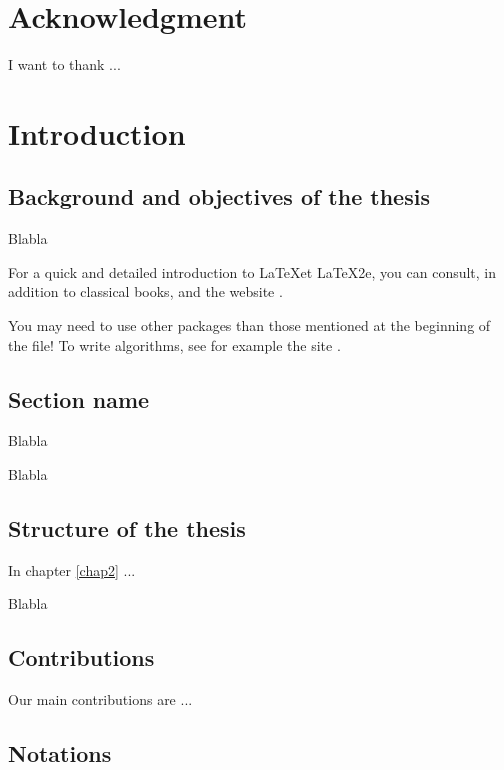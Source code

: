 \documentclass[11pt,a4paper,oneside]{book}
\begin{document}
\chapter*{Acknowledgment}
\thispagestyle{empty}

\noindent I want to thank ...

\thispagestyle{empty}
\setcounter{page}{0}
\tableofcontents
\mainmatter
\chapter{Introduction}
\setcounter{page}{1}

\vspace*{0.5cm}

\section{Background and objectives of the thesis}

Blabla

For a quick and detailed introduction to  \LaTeX et \LaTeX2e, you can consult, in addition to classical books, \cite{lamp,mittel} and the website \cite{oetik}.

You may need to use other packages than those mentioned at the beginning of the file! To write algorithms, see for example the site \cite{fiorio}.

\section{Section name}

Blabla

Blabla

\section{Structure of the thesis}

In chapter \ref{chap2} ...

Blabla

\section{Contributions}

Our main contributions are ...\vspace{1cm}

\clearpage
\section{Notations}
\end{document}
